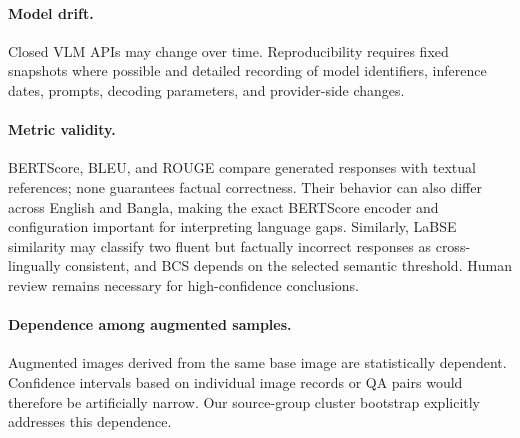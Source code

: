 \documentclass{article}
\begin{document}
\paragraph{Model drift.}
Closed VLM APIs may change over time. Reproducibility requires fixed snapshots where possible and detailed recording of model identifiers, inference dates, prompts, decoding parameters, and provider-side changes.

\paragraph{Metric validity.}
BERTScore, BLEU, and ROUGE compare generated responses with textual references; none guarantees factual correctness. Their behavior can also differ across English and Bangla, making the exact BERTScore encoder and configuration important for interpreting language gaps. Similarly, LaBSE similarity may classify two fluent but factually incorrect responses as cross-lingually consistent, and BCS depends on the selected semantic threshold. Human review remains necessary for high-confidence conclusions.

\paragraph{Dependence among augmented samples.}
Augmented images derived from the same base image are statistically dependent. Confidence intervals based on individual image records or QA pairs would therefore be artificially narrow. Our source-group cluster bootstrap explicitly addresses this dependence.

\newpage

\end{document}
